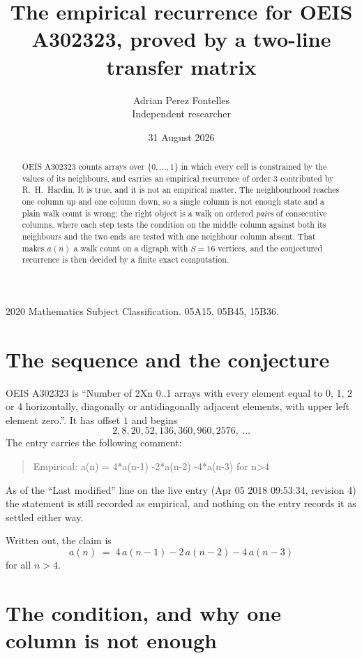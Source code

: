 \documentclass[11pt,a4paper]{article}
\title{The empirical recurrence for OEIS A302323, proved by a two-line transfer matrix}
\author{Adrian Perez Fontelles\\ \small Independent researcher}
\date{31 August 2026}
\theoremstyle{plain}
\theoremstyle{definition}
\begin{document}
\maketitle

\begin{abstract}
OEIS A302323 counts arrays over $\{0,\dots,1\}$ in which every cell is constrained by the
values of its neighbours, and carries an empirical recurrence of order $3$ contributed
by R.~H.~Hardin. It is true, and it is not an empirical matter. The neighbourhood reaches one
column up and one column down, so a single column is not enough state and a plain walk count
is wrong; the right object is a walk on ordered \emph{pairs} of consecutive columns, where
each step tests the condition on the middle column against both its neighbours and the two
ends are tested with one neighbour column absent. That makes $a(n)$ a walk count on a digraph
with $S=16$ vertices, and the conjectured recurrence is then decided by a finite exact
computation.
\end{abstract}

\noindent\small 2020 Mathematics Subject Classification. 05A15, 05B45, 15B36.\normalsize

\section{The sequence and the conjecture}

OEIS A302323 is ``Number of 2Xn 0..1 arrays with every element equal to 0, 1, 2 or 4 horizontally, diagonally or antidiagonally adjacent elements, with upper left element zero.''. It has offset $1$ and begins
\[
2, 8, 20, 52, 136, 360, 960, 2576,\ \dots
\]
The entry carries the following comment:
\begin{quote}\small
Empirical: a(n) = 4*a(n-1) -2*a(n-2) -4*a(n-3) for n>4
\end{quote}
As of the ``Last modified'' line on the live entry (Apr 05 2018 09:53:34, revision 4) the statement is
still recorded as empirical, and nothing on the entry records it as settled either way.

Written out, the claim is
\begin{equation}\label{eq:conj}
a(n)\;=\;4\,a(n-1) - 2\,a(n-2) - 4\,a(n-3)
\end{equation}
for all $n>4$.

\section{The condition, and why one column is not enough}
\end{document}
